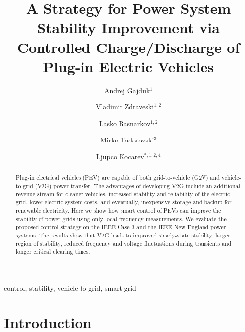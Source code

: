 \documentclass[final,12pt]{elsarticle}
\begin{document}
\begin{frontmatter}

\title{A Strategy for Power System Stability Improvement via Controlled Charge/Discharge of Plug-in Electric Vehicles}

\author{Andrej Gajduk$^1$}
\author{Vladimir Zdraveski$^{1,2}$}
\author{Lasko Basnarkov$^{1,2}$}
\author{Mirko Todorovski$^3$}
\author{Ljupco Kocarev$^{*,1,2,4}$}

\address{$^1$Macedonian Academy of Sciences and Arts, Skopje, Macedonia}
\address{$^2$Faculty of Computer Sciences and Engineering, University ``Ss Cyril and Methodius'', Skopje, Macedonia}
\address{$^3$Faculty of Electrical Engineering and Information Technologies, University ``Ss Cyril and Methodius'', Skopje, Macedonia}
\address{$^4$BioCircuits Institute, UC San Diego, La Jolla, CA 92093-0402, USA}

\begin{abstract}
Plug-in electrical vehicles (PEV) are capable of both
grid-to-vehicle (G2V) and vehicle-to-grid (V2G) power transfer. The advantages of developing V2G include
an additional revenue stream for cleaner vehicles, increased stability and
reliability of the electric grid, lower electric system costs, and eventually,
inexpensive storage and backup for renewable electricity. Here we show how smart
control of PEVs can improve the stability of power grids using only local
frequency measurements. We evaluate the proposed control strategy on the IEEE
Case 3 and the IEEE New England power systems. The results show that V2G leads
to improved steady-state stability, larger region of stability, reduced
frequency and voltage fluctuations during transients and longer critical clearing times.
\end{abstract}

\begin{keyword}
control, stability, vehicle-to-grid, smart grid
\end{keyword}

\end{frontmatter}

\section{Introduction}
\label{intro}
\end{document}
